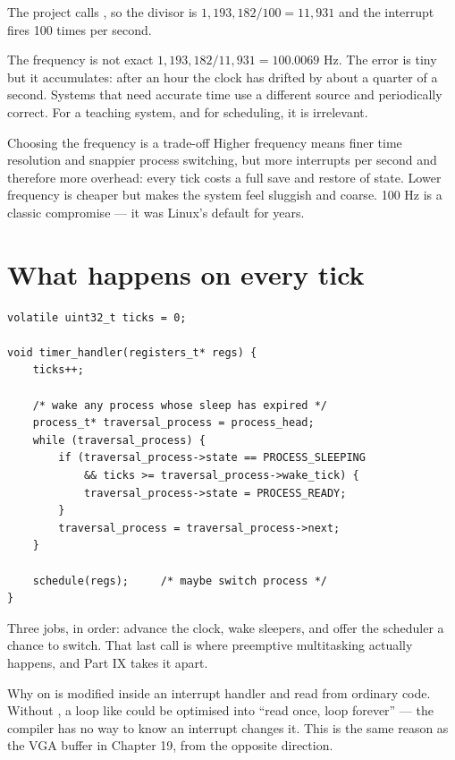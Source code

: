 The project calls , so the divisor is $1{,}193{,}182 / 100 = 11{,}931$ and the
interrupt fires 100 times per second. 

\begin{warn}{The frequency is not exact}
$1{,}193{,}182 / 11{,}931 = 100.0069$ Hz. The error is tiny but it accumulates: after an hour the
clock has drifted by about a quarter of a second. Systems that need accurate time use a different
source and periodically correct. For a teaching system, and for scheduling, it is irrelevant.
\end{warn}

\begin{concept}{Choosing the frequency is a trade-off}
Higher frequency means finer time resolution and snappier process switching, but more interrupts
per second and therefore more overhead: every tick costs a full save and restore of state. Lower
frequency is cheaper but makes the system feel sluggish and coarse. 100 Hz is a classic
compromise --- it was Linux's default for years.
\end{concept}

\section{What happens on every tick}

\begin{lstlisting}[style=c]
volatile uint32_t ticks = 0;

void timer_handler(registers_t* regs) {
    ticks++;

    /* wake any process whose sleep has expired */
    process_t* traversal_process = process_head;
    while (traversal_process) {
        if (traversal_process->state == PROCESS_SLEEPING
            && ticks >= traversal_process->wake_tick) {
            traversal_process->state = PROCESS_READY;
        }
        traversal_process = traversal_process->next;
    }

    schedule(regs);     /* maybe switch process */
}
\end{lstlisting}

Three jobs, in order: advance the clock, wake sleepers, and offer the scheduler a chance to switch.
That last call is where preemptive multitasking actually happens, and Part IX takes it apart.

\begin{concept}{Why  on }
 is modified inside an interrupt handler and read from ordinary code. Without
, a loop like  could be optimised into ``read once, loop
forever'' --- the compiler has no way to know an interrupt changes it. This is the same reason as
the VGA buffer in Chapter 19, from the opposite direction.
\end{concept}

